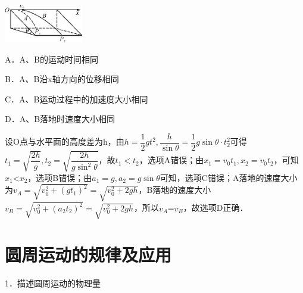 \begin{center}\includegraphics[width=1.35417in,height=0.65625in]{media/image170.png}\end{center}

A．A、B的运动时间相同

B．A、B沿x轴方向的位移相同

C．A、B运动过程中的加速度大小相同

D．A、B落地时速度大小相同
\begin{solution}
	设O点与水平面的高度差为h，由$h=\dfrac{1}{2} g t^{2}, \dfrac{h}{\sin \theta}=\dfrac{1}{2} g \sin \theta \cdot t_{2}^{2}$可得$t_{1}=\sqrt{\dfrac{2 h}{g}}, t_{2}=\sqrt{\dfrac{2 h}{g \sin ^{2} \theta}}$，故$t_1< t_2$，选项A错误；由$x_{1}=v_{0} t_{1}, x_{2}=v_{0} t_{2}$，可知$x_1$\textless $x_2$，选项B错误；由$a_{1}=g, a_{2}=g \sin \theta$可知，选项C错误；A落地的速度大小为$v_{A}=\sqrt{v_{0}^{2}+\left(g t_{1}\right)^{2}}=\sqrt{v_{0}^{2}+2 g h}$，B落地的速度大小$v_{B}=\sqrt{v_{0}^{2}+\left(a_{2} t_{2}\right)^{2}}=\sqrt{v_{0}^{2}+2 g h}$，所以$v_A$=$v_B$，故选项D正确．
\end{solution}

\newpage
\section{圆周运动的规律及应用}


1．描述圆周运动的物理量


